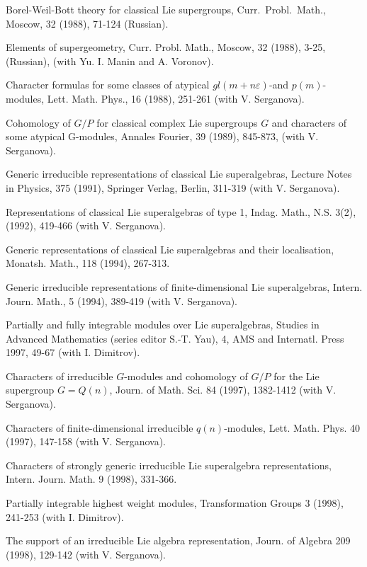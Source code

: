 \documentclass[11pt]{amsart}
\begin{document}
\myss \label{13.} Borel-Weil-Bott theory for classical Lie
supergroups, Curr.~Probl.~Math., Moscow, 32 (1988), 71-124
(Russian).

\myss \label{14.} Elements of supergeometry, Curr. Probl. Math.,
Moscow, 32 (1988), 3-25, (Russian), (with Yu. I. Manin and A.
Voronov).

\myss \label{15.} Character formulas for some classes of atypical
$gl(m+n\varepsilon)$-and $p(m)$-modules, Lett. Math. Phys., 16
(1988), 251-261 (with V. Serganova).

\myss \label{16.} Cohomology of $G/P$ for classical complex Lie
supergroups $G$ and characters of some atypical G-modules, Annales
Fourier, 39 (1989), 845-873, (with V. Serganova).

\myss \label{17.}  Generic irreducible representations of
classical Lie superalgebras, Lecture Notes in Physics, 375 (1991),
Springer Verlag, Berlin, 311-319 (with V. Serga\-nova).

\myss \label{18.}  Representations of classical Lie superalgebras
of type 1, Indag. Math., N.S. 3(2), (1992), 419-466 (with V.
Serganova).

\myss \label{19.}  Generic representations of classical Lie
superalgebras and their localisation, Monatsh. Math., 118 (1994),
267-313.

\myss \label{20.}  Generic irreducible representations of
finite-dimensional Lie superalgebras, Intern. Journ. Math., 5
(1994), 389-419 (with V. Serganova).

\myss \label{21.}  Partially and fully integrable modules over Lie
superalgebras, Studies in Advanced Mathematics (series editor
S.-T. Yau), 4, AMS and Internatl. Press 1997, 49-67 (with I.
Dimitrov).

\myss \label{22.}  Characters of irreducible $G$-modules and
cohomology of $G/P$ for the Lie supergroup $G=Q(n)$, Journ. of
Math. Sci. 84 (1997), 1382-1412 (with V. Serganova).

\myss \label{23.}  Characters of finite-dimensional irreducible
$q(n)$-modules, Lett. Math. Phys.  40 (1997), 147-158 (with V.
Serganova).

\myss \label{24.}  Characters of strongly generic irreducible Lie
superalgebra representations, Intern. Journ. Math. 9 (1998),
331-366.

\myss \label{25.}  Partially integrable highest weight modules,
Transformation Groups 3 (1998), 241-253 (with I. Dimitrov).

\myss \label{26.}  The support of an irreducible Lie algebra
representation, Journ. of Algebra 209 (1998), 129-142 (with V.
Serganova).
\end{document}
